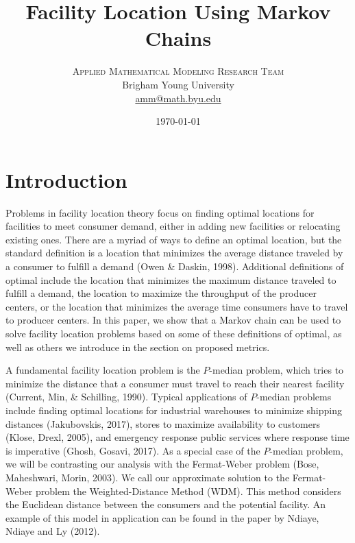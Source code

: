 \documentclass[twoside,twocolumn]{article}
\title{Facility Location Using Markov Chains}
\author{
\textsc{Applied Mathematical Modeling Research Team}\\[1ex]
\normalsize Brigham Young University \\
\normalsize \href{mailto:amm@math.byu.edu}{amm@math.byu.edu}
}
\date{\today}
\begin{document}
\maketitle

\section{Introduction}

Problems in facility location theory focus on finding optimal locations for facilities to meet consumer demand, either in adding new facilities or relocating existing ones.
There are a myriad of ways to define an optimal location, but the standard definition is a location that minimizes the average distance traveled by a consumer to fulfill a demand (Owen \& Daskin, 1998).
Additional definitions of optimal include the location that minimizes the maximum distance traveled to fulfill a demand, the location to maximize the throughput of the producer centers, or the location that minimizes the average time consumers have to travel to producer centers.
In this paper, we show that a Markov chain can be used to solve facility location problems based on some of these definitions of optimal, as well as others we introduce in the section on proposed metrics.

A fundamental facility location problem is the $P$-median problem, which tries to minimize the distance that a consumer must travel to reach their nearest facility (Current, Min, \& Schilling, 1990).
Typical applications of $P$-median problems include finding optimal locations for industrial warehouses to minimize shipping distances (Jakubovskis, 2017), stores to maximize availability to customers (Klose, Drexl, 2005), and emergency response public services where response time is imperative (Ghosh, Gosavi, 2017).
As a special case of the $P$-median problem, we will be contrasting our analysis with the Fermat-Weber problem (Bose, Maheshwari, Morin, 2003). 
We call our approximate solution to the Fermat-Weber problem the Weighted-Distance Method (WDM). %
This method considers the Euclidean distance between the consumers and the potential facility. 
An example of this model in application can be found in the paper by Ndiaye, Ndiaye and Ly (2012).
\end{document}

